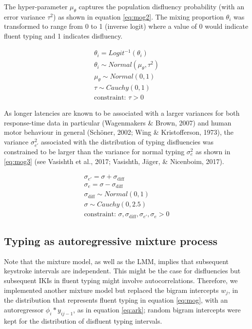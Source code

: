 \documentclass[english,man,floatsintext]{apa7}
\begin{document}
The hyper-parameter \(\mu_{\theta}\) captures the population disfluency probability (with an error variance \(\tau^2\)) as shown in equation \ref{eq:mog2}. The mixing proportion \(\theta_i\) was transformed to range from 0 to 1 (inverse logit) where a value of 0 would indicate fluent typing and 1 indicates disfluency.

\[
\tag{8}
\begin{aligned}
        \theta_i = Logit^{-1}(\theta_i)\\
        \theta_i \sim Normal(\mu_{\theta},\tau^2)\\
        \mu_{\theta} \sim Normal(0,1)\\
        \tau \sim Cauchy(0,1)\\
        \text{constraint: } \tau > 0
\end{aligned}   
\label{eq:mog2}
\]

As longer latencies are known to be associated with a larger variances for both response-time data in particular (Wagenmakers \& Brown, 2007) and human motor behaviour in general (Schöner, 2002; Wing \& Kristofferson, 1973), the variance \(\sigma_{e'}^2\) associated with the distribution of typing disfluencies was constrained to be larger than the variance for normal typing \(\sigma_e^2\) as shown in \ref{eq:mog3} (see Vasishth et al., 2017; Vasishth, Jäger, \& Nicenboim, 2017).

\[
\tag{9}
\begin{aligned}
        \sigma_{e'} = \sigma + \sigma_{\text{diff}}\\
        \sigma_{e} = \sigma - \sigma_{\text{diff}}\\
        \sigma_{\text{diff}} \sim Normal(0,1)\\
        \sigma \sim Cauchy(0,2.5)\\
        \text{constraint: } \sigma, \sigma_{\text{diff}}, \sigma_{e'}, \sigma_{e} > 0
\end{aligned}   
\label{eq:mog3}
\]

\hypertarget{typing-as-autoregressive-mixture-process}{%
\subsection{Typing as autoregressive mixture process}\label{typing-as-autoregressive-mixture-process}}

Note that the mixture model, as well as the LMM, implies that subsequent keystroke intervals are independent. This might be the case for disfluencies but subsequent IKIs in fluent typing might involve autocorrelations. Therefore, we implemented another mixture model but replaced the bigram intercepts \(w_j\), in the distribution that represents fluent typing in equation \ref{eq:mog}, with an autoregressor \(\phi_i*y_{ij-1}\), as in equation \ref{eq:ark}; random bigram intercepts were kept for the distribution of disfluent typing intervals.
\end{document}
